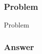 
\begin{frame}
\frametitle{Problem}

\begin{block}{Problem}
\end{block}
\end{frame}

\begin{frame}[allowframebreaks]
\frametitle{Answer}


\end{frame}